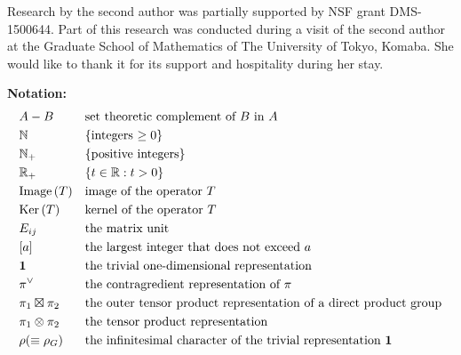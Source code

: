 Research by the second author was partially supported by  NSF grant DMS-1500644. 
Part of this research was conducted during a visit of the second author at  the Graduate School of Mathematics of The University of Tokyo, Komaba. 
She would like to thank it for its support and hospitality during her stay.

\vskip 3pc
{\bf{Notation:}}
\begin{align*}
& A \setminus B
\quad
&&\text{set theoretic complement of $B$ in $A$}
\\
&{\mathbb{N}}
&&\text{$\{\text{integers $\ge 0$}\}$}
\\
&{\mathbb{N}}_+
&&\text{$\{\text{positive integers}\}$}
\\
&{\mathbb{R}}_+
&&\text{$\{t \in {\mathbb{R}}:t>0\}$}
\\
& {\operatorname{Image}}\, (T)
&&\text{image of the operator $T$}
\\
& {\operatorname{Ker}}\, (T)
&&\text{kernel of the operator $T$}
\\
& E_{i j}
&&\text{the matrix unit}
\\
&[a]
&&\text{the largest integer that does not exceed $a$}
\\
&{\bf{1}}
&&\text{the trivial one-dimensional representation}
\\
& \pi^{\vee}
&&\text{the contragredient representation of $\pi$}
\\
& \pi_1 \boxtimes \pi_2
&&\text{the outer tensor product representation of a direct product group}
\\
& \pi_1 \otimes \pi_2
&&\text{the tensor product representation}
\\
& \rho (\equiv \rho_G)
&&\text{the infinitesimal character of the trivial representation ${\bf{1}}$}
\end{align*}


